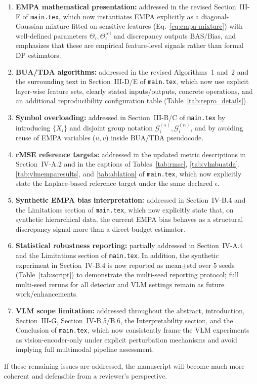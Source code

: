 \documentclass[11pt]{article}
\begin{document}
\begin{enumerate}
    \item \textbf{EMPA mathematical presentation:} addressed in the revised Section~III-F of \texttt{main.tex}, which now instantiates EMPA explicitly as a diagonal-Gaussian mixture fitted on sensitive features (Eq.~\eqref{eq:empa-mixture}) with well-defined parameters $\Theta_\epsilon,\Theta_\epsilon^{\mathrm{ref}}$ and discrepancy outputs BAS/Bias, and emphasizes that these are empirical feature-level signals rather than formal DP estimators.
    \item \textbf{BUA/TDA algorithms:} addressed in the revised Algorithms~1 and~2 and the surrounding text in Section~III-D/E of \texttt{main.tex}, which now use explicit layer-wise feature sets, clearly stated inputs/outputs, concrete operations, and an additional reproducibility configuration table (Table~\ref{tab:repro_details}).
    \item \textbf{Symbol overloading:} addressed in Section~III-B/C of \texttt{main.tex} by introducing $\{X_i\}$ and disjoint group notation $\mathcal{G}_i^{(s)},\mathcal{G}_i^{(n)}$, and by avoiding reuse of EMPA variables ($u,v$) inside BUA/TDA pseudocode.
    \item \textbf{rMSE reference targets:} addressed in the updated metric descriptions in Section~IV-A.2 and in the captions of Tables~\ref{tab:rmse}, \ref{tab:vlmbuatda}, \ref{tab:vlmemparesults}, and \ref{tab:ablation} of \texttt{main.tex}, which now explicitly state the Laplace-based reference target under the same declared $\epsilon$.
    \item \textbf{Synthetic EMPA bias interpretation:} addressed in Section~IV-B.4 and the Limitations section of \texttt{main.tex}, which now explicitly state that, on synthetic hierarchical data, the current EMPA bias behaves as a structural discrepancy signal more than a direct budget estimator.
    \item \textbf{Statistical robustness reporting:} partially addressed in Section~IV-A.4 and the Limitations section of \texttt{main.tex}. In addition, the synthetic experiment in Section~IV-B.4 is now reported as mean$\pm$std over 5 seeds (Table~\ref{tab:script}) to demonstrate the multi-seed reporting protocol; full multi-seed reruns for all detector and VLM settings remain as future work/enhancements.
    \item \textbf{VLM scope limitation:} addressed throughout the abstract, introduction, Section~III-G, Section~IV-B.5/B.6, the Interpretability section, and the Conclusion of \texttt{main.tex}, which now consistently frame the VLM experiments as vision-encoder-only under explicit perturbation mechanisms and avoid implying full multimodal pipeline assessment.
\end{enumerate}

If these remaining issues are addressed, the manuscript will become much more coherent and defensible from a reviewer's perspective.
\end{document}
